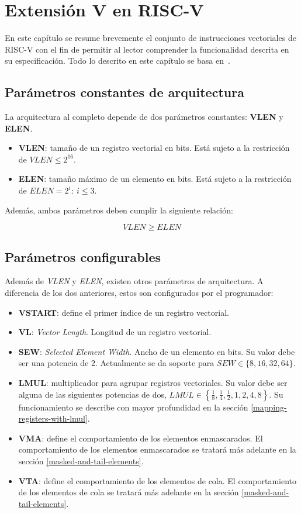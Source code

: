\chapter{Extensión V en RISC-V}\label{chap:v-extenssion}

En este capítulo se resume brevemente el conjunto de instrucciones vectoriales
de RISC-V con el fin de permitir al lector comprender la
funcionalidad descrita en su especificación. Todo lo descrito en este capítulo se basa en~\cite{riscv-isa2024}.

\section{Parámetros constantes de arquitectura}

La arquitectura al completo depende de dos parámetros constantes: \textbf{VLEN} y \textbf{ELEN}.
\begin{itemize}
    \item \textbf{VLEN}: tamaño de un registro vectorial en bits. Está sujeto a la restricción de $VLEN \le 2^{16}$.
    \item \textbf{ELEN}: tamaño máximo de un elemento en bits. Está sujeto a la restricción de $ELEN = 2^i:\ i\le 3$.
\end{itemize}

Además, ambos parámetros deben cumplir la siguiente relación:

$$VLEN \ge ELEN$$

\section{Parámetros configurables}\label{conf-parameters}

Además de \textit{VLEN} y \textit{ELEN}, existen otros parámetros de arquitectura. A diferencia de los dos anteriores, estos son configurados por el programador:
\begin{itemize}
    \item\textbf{VSTART}: define el primer índice de un registro vectorial.
    \item\textbf{VL}: \textit{Vector Length}. Longitud de un registro vectorial.
    \item\textbf{SEW}: \textit{Selected Element Width}. Ancho de un elemento en bits. Su valor debe ser una potencia de 2. Actualmente se da soporte para $SEW\in \{8, 16, 32, 64\}$.
    \item\textbf{LMUL}: multiplicador para agrupar registros vectoriales. Su valor debe ser alguna de las siguientes potencias de dos, $LMUL \in \left\{\frac18,\frac14,\frac12, 1, 2, 4, 8\right\}$. Su funcionamiento se describe con mayor profundidad en la sección \ref{mapping-registers-with-lmul}.
    \item\textbf{VMA}: define el comportamiento de los elementos enmascarados. El comportamiento de los elementos enmascarados se tratará más adelante en la sección \ref{masked-and-tail-elements}.
    \item\textbf{VTA}: define el comportamiento de los elementos de cola. El comportamiento de los elementos de cola se tratará más adelante en la sección \ref{masked-and-tail-elements}.
\end{itemize}

